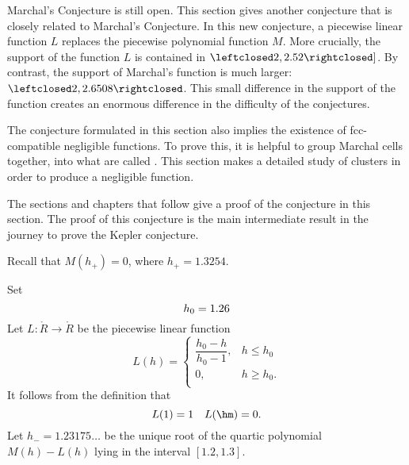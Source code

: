 \begin{summary} Marchal's Conjecture is still open.  This section
gives another conjecture that is closely related to Marchal's
Conjecture.  In this new conjecture, a piecewise linear function $L$
replaces the piecewise polynomial function $M$.  More crucially, the
support of the function $L$ is contained in
$\leftclosed2,2.52\rightclosed]$.  By contrast, the support of
Marchal's function is much larger:
$\leftclosed2,2.6508\rightclosed$.  This small difference in the
support of the function creates an enormous difference in the
difficulty of the conjectures.

The conjecture formulated in this section also implies the existence
of fcc-compatible negligible functions.  To prove this, it is
helpful to group Marchal cells together, into what are called
.  This section makes a detailed study of clusters
in order to produce a negligible function.

The sections and chapters that follow give a proof of the
conjecture in this section.  The proof of this conjecture is the
main intermediate result in the journey to prove the Kepler
conjecture.
\end{summary}

Recall that $M(h_+) = 0$, where   $h_+ = 1.3254$.
%

\begin{definition}[$L$,~$h_0$,~$h_-$]\label{def:L}
Set
\begin{displaymath}
h_0 = 1.26\\  %
\end{displaymath}
Let $L:\ring{R}\to\ring{R}$ be the piecewise linear function 
\begin{displaymath}
L(h) = \begin{cases}
\dfrac{h_0-h}{h_0-1}, & h \le h_0 \\
0, & h\ge h_0. \\
\end{cases}
\end{displaymath}
It follows from the definition that
\begin{displaymath}
L(1) = 1\quad L(\hm) = 0.
\end{displaymath}
Let $h_- = 1.23175\ldots$ be the unique root of the quartic polynomial
$M(h)-L(h)$ lying in the interval $[1.2,1.3]$.
%
%
%
\end{definition}


